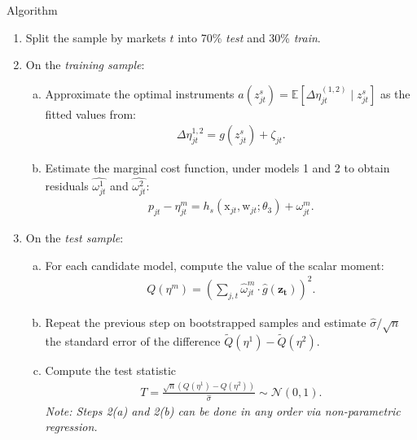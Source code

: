 \documentclass[xcolor=pdftex,dvipsnames,table,mathserif,aspectratio=169]{beamer}
\begin{document}
\begin{frame}[shrink=25,plain]{Algorithm}
\begin{enumerate}[(1)]
\item Split the sample by markets $t$ into 70\% \textit{test} and 30\% \textit{train}.
\item On the \textit{training sample}:
\begin{enumerate}[(a)]
\item Approximate the optimal instruments $a(z_{jt}^s) = \mathbb{E}[\Delta \eta_{jt}^{(1,2)} \mid z_{jt}^s]$ as the fitted values from:
\begin{align*}
    \Delta\eta_{jt}^{1,2} = g(z_{jt}^s) + \zeta_{jt}.
\end{align*}
\item Estimate the marginal cost function, under models 1 and 2 to obtain residuals $\widehat{\omega_{jt}^{1}}$ and $\widehat{\omega_{jt}^{2}}$:
 \begin{align*}
 p_{jt} -\eta^m_{jt}= h_s(\textrm{x}_{jt},\mathrm{w}_{jt}; \theta_3) + \omega^m_{jt}.
 \end{align*}
\end{enumerate}
\item On the \textit{test sample}:
\begin{enumerate}[(a)]
\item For each candidate model, compute the value of the scalar moment:\footnotemark
\begin{align*}
 Q(\eta^m) =\left(\sum_{j,t} \hat\omega_{jt}^m\cdot \hat{g}(\mathbf{z_t}) \right)^2.
\end{align*}
\item Repeat the previous step on bootstrapped samples and estimate $\hat\sigma/\sqrt{n}$ the standard error of the difference $\tilde Q(\eta^1) - \tilde Q(\eta^2)$.
\item Compute the test statistic
\begin{align*}
T = \frac{\sqrt{n} \left(Q(\eta^1) -  Q(\eta^2) \right)}{\widehat{\sigma}} \sim \mathcal{N}(0,1).
\end{align*}
\textit{Note: Steps 2(a) and 2(b) can be done in any order via non-parametric regression.}
\end{enumerate}
\end{enumerate}
\end{frame}
\end{document}
